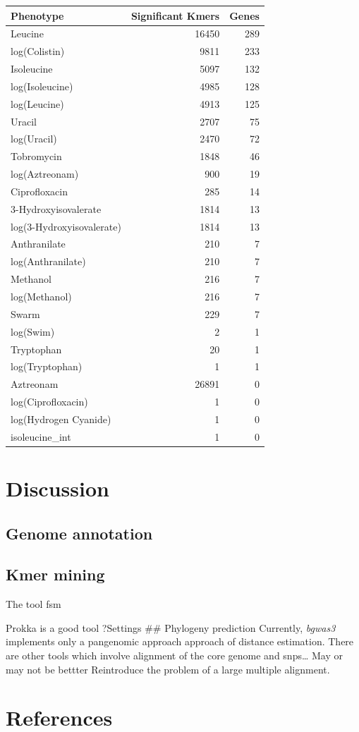 \documentclass[]{DissertateUSU}
\begin{document}
\begin{longtable}[]{@{}lrr@{}}
\toprule
Phenotype & Significant Kmers & Genes\tabularnewline
\midrule
\endhead
Leucine & 16450 & 289\tabularnewline
log(Colistin) & 9811 & 233\tabularnewline
Isoleucine & 5097 & 132\tabularnewline
log(Isoleucine) & 4985 & 128\tabularnewline
log(Leucine) & 4913 & 125\tabularnewline
Uracil & 2707 & 75\tabularnewline
log(Uracil) & 2470 & 72\tabularnewline
Tobromycin & 1848 & 46\tabularnewline
log(Aztreonam) & 900 & 19\tabularnewline
Ciprofloxacin & 285 & 14\tabularnewline
3-Hydroxyisovalerate & 1814 & 13\tabularnewline
log(3-Hydroxyisovalerate) & 1814 & 13\tabularnewline
Anthranilate & 210 & 7\tabularnewline
log(Anthranilate) & 210 & 7\tabularnewline
Methanol & 216 & 7\tabularnewline
log(Methanol) & 216 & 7\tabularnewline
Swarm & 229 & 7\tabularnewline
log(Swim) & 2 & 1\tabularnewline
Tryptophan & 20 & 1\tabularnewline
log(Tryptophan) & 1 & 1\tabularnewline
Aztreonam & 26891 & 0\tabularnewline
log(Ciprofloxacin) & 1 & 0\tabularnewline
log(Hydrogen Cyanide) & 1 & 0\tabularnewline
isoleucine\_int & 1 & 0\tabularnewline
\bottomrule
\end{longtable}

\hypertarget{discussion}{%
\section{Discussion}\label{discussion}}

\hypertarget{genome-annotation-1}{%
\subsection{Genome annotation}\label{genome-annotation-1}}

\hypertarget{kmer-mining-1}{%
\subsection{Kmer mining}\label{kmer-mining-1}}

The tool fsm

Prokka is a good tool ?Settings \#\# Phylogeny prediction Currently,
\emph{bgwas3} implements only a pangenomic approach approach of distance
estimation. There are other tools which involve alignment of the core
genome and snps\ldots{} May or may not be bettter Reintroduce the
problem of a large multiple alignment.

\hypertarget{references}{%
\section*{References}\label{references}}
\end{document}
